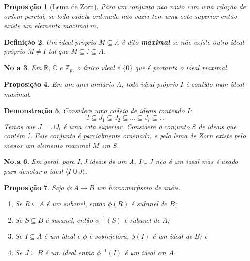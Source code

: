 \documentclass[11pt]{article}
\theoremstyle{plain}
\newtheorem{definicao}{Definição}[section]
\newtheorem{nota}[definicao]{Nota}
\newtheorem{proposicao}[definicao]{Proposição}
\newtheorem{proplivre}[definicao]{Proposição}
\theoremstyle{nonumberplain}
\newtheorem{demonstracao}[definicao]{Demonstração}
\newcommand{\Z}{\mathbb{Z}}
\newcommand{\R}{\mathbb{R}}
\newcommand{\C}{\mathbb{C}}
\newcommand{\inv}[1]{#1^{-1}}
\newcommand{\set}[1]{\{#1\}}
\newcommand{\braket}[1]{\langle #1 \rangle}
\newcommand{\sseq}{\subseteq}
\begin{document}
\begin{proplivre}[Lema de Zorn]
    Para um conjunto não vazio com uma relação de ordem parcial, se toda cadeia ordenada não vazia tem uma cota superior então existe um elemento maximal $m$.
\end{proplivre}

\begin{definicao}
    Um ideal próprio $M \sseq A$ é dito \textbf{maximal} se não existe outro ideal próprio $M \neq I$ tal que $M \sseq I \sseq A$.
\end{definicao}

\begin{nota}
    Em $\R$, $\C$ e $\Z_p$, o único ideal é $\set 0$ que é portanto o ideal maximal.
\end{nota}

\begin{proposicao}
    Em um anel unitário $A$, todo ideal próprio $I$ é contido num ideal maximal.
\end{proposicao}

\begin{demonstracao}
    Considere uma cadeia de ideais contendo $I$: \begin{equation}
        I \sseq J_1 \sseq J_2 \sseq ... \sseq J_i \sseq ...
    \end{equation}
    Temos que $J = \cup J_i$ é uma cota superior. Considere o conjunto $S$ de ideais que contém $I$. Este conjunto é parcialmente ordenado, e pelo lema de Zorn existe pelo menos um elemento maximal $M$ em $S$.
\end{demonstracao}

\begin{nota}
    Em geral, para $I, J$ ideais de um $A$, $I \cup J$ não é um ideal mas é usado para denotar o ideal $\braket{I \cup J}$.
\end{nota}

\begin{proposicao}
    Seja $\phi : A \to B$ um homomorfismo de anéis.

    \begin{enumerate}
        \item Se $R \sseq A$ é um subanel, então $\phi(R)$ é subanel de $B$;
        \item Se $S \sseq B$ é subanel, então $\inv \phi(S)$ é subanel de $A$;
        \item Se $I \sseq A$ é um ideal e $\phi$ é sobrejetora, $\phi(I)$ é um ideal de $B$; e
        \item Se $J \sseq B$ é um ideal então $\inv \phi (I)$ é um ideal em $A$.
    \end{enumerate}
\end{proposicao}
\end{document}
